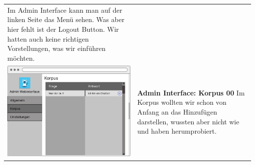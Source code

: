 \begin{tabular}{C{6cm}  L{7cm}}
    Im Admin Interface kann man auf der linken Seite das Menü sehen. Was aber hier fehlt ist der Logout Button.
    Wir hatten auch keine richtigen Vorstellungen, was wir einführen möchten.                                                                   \\
    \includegraphics[width=\linewidth]{bilder/old vers. UI Design/Admin Interface (1).png}       & \textbf{Admin Interface: Korpus 00} \newline
    Im Korpus wollten wir schon von Anfang an das Hinzufügen darstellen, wussten aber nicht
    wie und haben herumprobiert.
\end{tabular}

